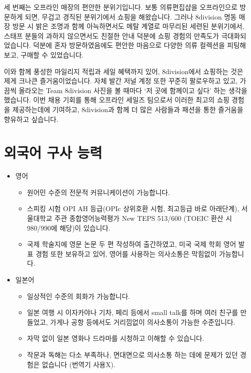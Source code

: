 세 번째는 오프라인 매장의 편안한 분위기입니다. 보통 의류편집샵을 오프라인으로 방문하게 되면, 무겁고 경직된 분위기에서 쇼핑을 해왔습니다. 그러나 8division 명동 매장 방문 시 밝은 조명과 함께 아늑하면서도 메탈 계열로 마무리된 세련된 분위기에서, 스태프 분들의 과하지 않으면서도 친절한 안내 덕분에 쇼핑 경험의 만족도가 극대화되었습니다. 덕분에 혼자 방문하였음에도 편안한 마음으로 다양한 의류 컬렉션을 피팅해보고, 구매할 수 있었습니다.

이와 함께 풍성한 마일리지 적립과 세일 혜택까지 있어, 8division에서 쇼핑하는 것은 제게 크나큰 즐거움이었습니다. 자체 발간 저널 계정 또한 꾸준히 팔로우하고 있고, 가끔씩 올라오는 Team 8division 사진을 볼 때마다 `저 곳에 함께이고 싶다' 하는 생각을 했습니다. 이번 채용 기회를 통해 오프라인 세일즈 팀으로서 이러한 최고의 쇼핑 경험을 제공하는데에 기여하고, 8division과 함께 더 많은 사람들과 패션을 통한 즐거움을 향유하고 싶습니다.


\section*{외국어 구사 능력}
\begin{itemize}
    \item 영어
          \begin{itemize}
              \item 원어민 수준의 전문적 커뮤니케이션이 가능합니다.
              \item 스피킹 시험 OPI AH 등급(OPIc 상위호환 시험, 최고등급 바로 아래단계), 서울대학교 주관 종합영어능력평가 New TEPS 513/600 (TOEIC 환산 시 980/990에 해당)이 있습니다.
              \item 국제 학술지에 영문 논문 두 편 작성하여 출간하였고, 미국 국제 학회 영어 발표 경험 또한 보유하고 있어, 영어를 사용하는 의사소통은 막힘없이 가능합니다.
          \end{itemize}
    \item 일본어
          \begin{itemize}
              \item 일상적인 수준의 회화가 가능합니다.
              \item 일본 여행 시 이자카야나 기차, 페리 등에서 small talk를 하며 여러 친구를 만들었고, 가게나 공항 등에서도 거리낌없이 의사소통이 가능한 수준입니다.
              \item 자막 없이 일본 영화나 드라마를 시청하고 이해할 수 있습니다.
              \item 작문과 독해는 다소 부족하나, 면대면으로 의사소통 하는 데에 문제가 있던 경험은 없습니다 (번역기 사용X).
          \end{itemize}
\end{itemize}

